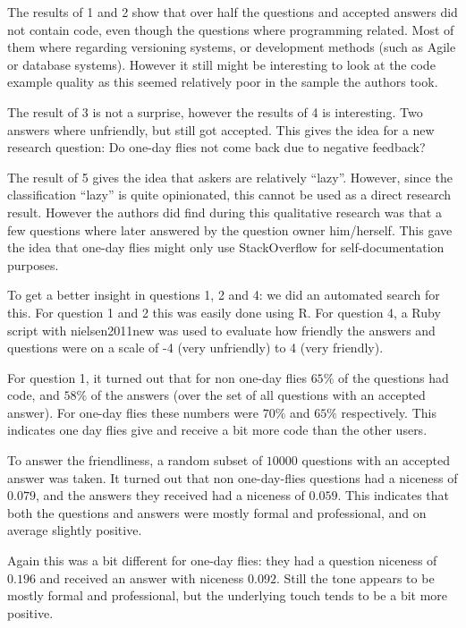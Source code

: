 \documentclass[conference]{IEEEtran}
\begin{document}
The results of 1 and 2 show that over half the questions and accepted answers
did not contain code, even though the questions where programming related. Most
of them where regarding versioning systems, or development methods (such as
Agile or database systems).  However it still might be interesting to look at
the code example quality as this seemed relatively poor in the sample the
authors took.

The result of 3 is not a surprise, however the results of 4 is interesting. Two
answers where unfriendly, but still got accepted. This gives the idea for a new
research question: Do one-day flies  not come back due to negative feedback? 

The result of 5  gives the idea that askers are relatively ``lazy''. However,
since the classification ``lazy'' is quite opinionated, this cannot be used as
a direct research result. However the authors did find during this qualitative
research was that a few questions where later answered by the question owner
him/herself. This gave the idea that one-day flies might only use StackOverflow
for self-documentation purposes. 

To get a better insight in questions 1, 2 and 4: we did an automated search for
this. For question 1 and 2 this was easily done using R. For question 4, a Ruby
script with nielsen2011new \cite{nielsen2011new} was used to evaluate how
friendly the answers and questions were on a scale of -4 (very unfriendly) to 4
(very friendly). 

For question 1, it turned out that for non one-day flies $65\%$ of the
questions had code, and $58\%$ of the answers (over the set of all questions
with an accepted answer). For one-day flies these numbers were $70\%$ and
$65\%$ respectively. This indicates one day flies give and receive a bit more
code than the other users.

To answer the friendliness, a random subset of $10000$ questions with an
accepted answer was taken. It turned out that non one-day-flies questions had a
niceness of $0.079$, and the answers they received had a niceness of $0.059$.
This indicates that both the questions and answers were mostly formal and
professional, and on average slightly positive.

Again this was a bit different for one-day flies: they had a question niceness
of $0.196$ and received an answer with niceness $0.092$. Still the tone appears
to be mostly formal and professional, but the underlying touch tends to be a
bit more positive.
\end{document}
